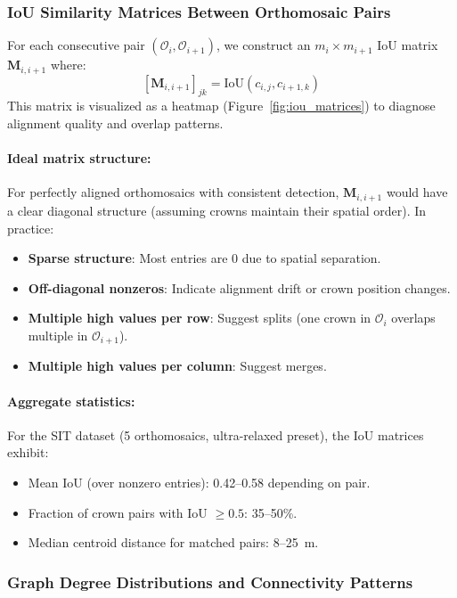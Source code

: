 \subsubsection{IoU Similarity Matrices Between Orthomosaic Pairs}

For each consecutive pair $(\mathcal{O}_i, \mathcal{O}_{i+1})$, we construct an $m_i \times m_{i+1}$ IoU matrix $\mathbf{M}_{i,i+1}$ where:
\[
[\mathbf{M}_{i,i+1}]_{jk} = \text{IoU}(c_{i,j}, c_{i+1,k})
\]
This matrix is visualized as a heatmap (Figure~\ref{fig:iou_matrices}) to diagnose alignment quality and overlap patterns.

\paragraph{Ideal matrix structure:} For perfectly aligned orthomosaics with consistent detection, $\mathbf{M}_{i,i+1}$ would have a clear diagonal structure (assuming crowns maintain their spatial order). In practice:
\begin{itemize}
    \item \textbf{Sparse structure}: Most entries are 0 due to spatial separation.
    \item \textbf{Off-diagonal nonzeros}: Indicate alignment drift or crown position changes.
    \item \textbf{Multiple high values per row}: Suggest splits (one crown in $\mathcal{O}_i$ overlaps multiple in $\mathcal{O}_{i+1}$).
    \item \textbf{Multiple high values per column}: Suggest merges.
\end{itemize}

\paragraph{Aggregate statistics:} For the SIT dataset (5 orthomosaics, ultra-relaxed preset), the IoU matrices exhibit:
\begin{itemize}
    \item Mean IoU (over nonzero entries): 0.42--0.58 depending on pair.
    \item Fraction of crown pairs with IoU $\geq 0.5$: 35--50\%.
    \item Median centroid distance for matched pairs: 8--25~m.
\end{itemize}

\subsubsection{Graph Degree Distributions and Connectivity Patterns}

